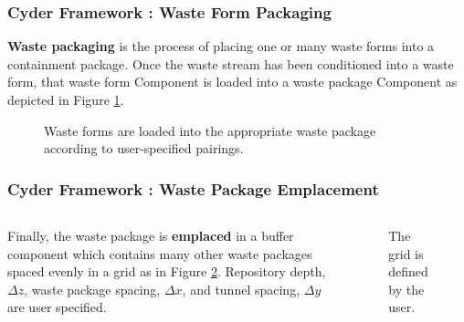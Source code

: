 \begin{frame}[ctb!]
  \frametitle{Cyder Framework : Waste Form Packaging}
  \footnotesize{

    \textbf{Waste packaging} is the process of placing one or many waste forms into a 
containment package. Once the waste stream has been conditioned into a waste 
form, that waste form Component is loaded into a waste package Component as 
depicted in Figure \ref{fig:wf_packaging}.  

\begin{figure}[htbp!]
\begin{center}
\def\svgwidth{.5\textwidth}

\end{center}
\caption{Waste forms are loaded into the appropriate waste package 
according to user-specified pairings.}
\label{fig:wf_packaging}
\end{figure}
}
\end{frame}

\begin{frame}[ctb!]
  \frametitle{Cyder Framework : Waste Package Emplacement}
  \footnotesize{
  
\begin{columns}[c]
  Finally, the waste package is \textbf{emplaced} in a buffer component which 
contains many other waste packages spaced evenly in a grid as in Figure 
\ref{fig:repo_layout}. Repository depth, $\Delta z$, waste package spacing, 
$\Delta x$, and tunnel spacing, $\Delta y$ are user specified.


\begin{figure}[htbp!]
\begin{center}
\def\svgwidth{.5\textwidth}

\end{center}
\caption{ The grid is defined by the user.  }
\label{fig:repo_layout}
\end{figure}
\end{columns}

}
\end{frame}

